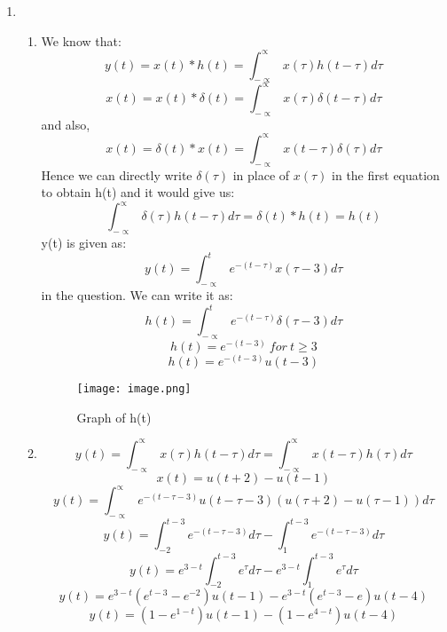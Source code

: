 \documentclass[10pt,a4paper, margin=1in]{article}
\begin{document}
\begin{enumerate}
\item %
    \begin{enumerate}
    \item %
    We know that:
    \[y(t)=x(t) \ast h(t)= \int_{-\propto}^{\propto}x(\tau)h(t-\tau)d\tau\]
    \[x(t)=x(t) \ast \delta(t)= \int_{-\propto}^{\propto}x(\tau)\delta(t-\tau)d\tau\]
    and also, 
    \[x(t)=\delta(t) \ast x(t) = \int_{-\propto}^{\propto}x(t-\tau)\delta(\tau)d\tau\]
    Hence we can directly write $\delta(\tau)$ in place of $x(\tau)$ in the first equation to obtain h(t) and it would give us:
     \[\int_{-\propto}^{\propto}\delta(\tau)h(t-\tau)d\tau=\delta(t)\ast h(t)=h(t)\]
     y(t) is given as:
     \[y(t)=\int_{-\propto}^{t}e^{-(t-\tau)}x(\tau-3)d\tau\]
     in the question.
     We can write it as:
      \[h(t)=\int_{-\propto}^{t}e^{-(t-\tau)}\delta(\tau-3)d\tau\] 
      \[h(t)=e^{-(t-3)} \ for \ t \geq 3\] 
      \[h(t)=e^{-(t-3)}u(t-3)\] 
    \begin{center}
        \begin{figure}[H]
        \hspace{15mm}\texttt{[image: image.png]}
        \caption{Graph of h(t)}
        \label{fig:htgraph}
    \end{figure}
    \end{center}
    \item %
     \[y(t)=\int_{-\propto}^{\propto}x(\tau)h(t-\tau)d\tau = \int_{-\propto}^{\propto}x(t-\tau)h(\tau)d\tau\]
     \[x(t)=u(t+2)-u(t-1)\] 
     \[y(t)=\int_{-\propto}^{\propto}e^{-(t-\tau-3)}u(t-\tau-3)(u(\tau+2)-u(\tau-1))d\tau\]
     \[y(t)=\int_{-2}^{t-3}e^{-(t-\tau-3)}d\tau - \int_{1}^{t-3}e^{-(t-\tau-3)}d\tau\]
     \[y(t)=e^{3-t}\int_{-2}^{t-3}e^{\tau}d\tau - e^{3-t}\int_{1}^{t-3}e^{\tau}d\tau\]
     \[y(t)=e^{3-t}(e^{t-3}-e^{-2})u(t-1) - e^{3-t}(e^{t-3}-e)u(t-4)\]
     \[y(t)=(1-e^{1-t})u(t-1) - (1-e^{4-t})u(t-4)\]
     
    \end{enumerate}
    

\end{enumerate}
\end{document}
